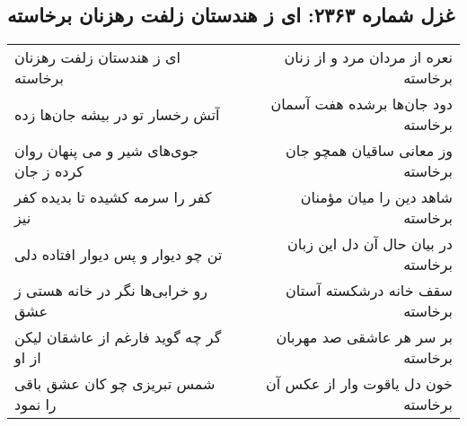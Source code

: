 \begin{center}
\section*{غزل شماره ۲۳۶۳: ای ز هندستان زلفت رهزنان برخاسته}
\label{sec:2363}
\begin{longtable}{l p{0.5cm} r}
ای ز هندستان زلفت رهزنان برخاسته
&&
نعره از مردان مرد و از زنان برخاسته
\\
آتش رخسار تو در بیشه جان‌ها زده
&&
دود جان‌ها برشده هفت آسمان برخاسته
\\
جوی‌های شیر و می پنهان روان کرده ز جان
&&
وز معانی ساقیان همچو جان برخاسته
\\
کفر را سرمه کشیده تا بدیده کفر نیز
&&
شاهد دین را میان مؤمنان برخاسته
\\
تن چو دیوار و پس دیوار افتاده دلی
&&
در بیان حال آن دل این زبان برخاسته
\\
رو خرابی‌ها نگر در خانه هستی ز عشق
&&
سقف خانه درشکسته آستان برخاسته
\\
گر چه گوید فارغم از عاشقان لیکن از او
&&
بر سر هر عاشقی صد مهربان برخاسته
\\
شمس تبریزی چو کان عشق باقی را نمود
&&
خون دل یاقوت وار از عکس آن برخاسته
\\
\end{longtable}
\end{center}
